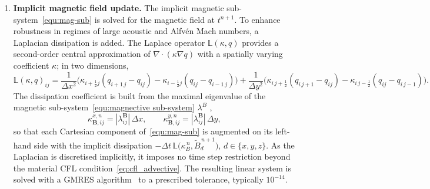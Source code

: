 \documentclass[a4paper,fleqn]{cas-sc}
\theoremstyle{definition}
\theoremstyle{remark}
\begin{document}
\begin{enumerate}
\item \textbf{Implicit magnetic field update.}
The implicit magnetic sub-system~\eqref{equ:mag-sub} is solved for the magnetic
field at $t^{n+1}$. To enhance robustness in regimes of large acoustic and
Alfvén Mach numbers, a Laplacian dissipation is added. The
Laplace operator $\mathbb{L}(\kappa,q)$ provides a second-order central
approximation of $\nabla\!\cdot(\kappa\nabla q)$ with a spatially varying
coefficient $\kappa$; in two dimensions,
\begin{equation}
\label{eq:laplacian}
\mathbb{L}(\kappa,q)_{ij}
= \frac{1}{\Delta x^{2}}\Big(
   \kappa_{i+\frac12 j}(q_{i+1\,j}-q_{ij})
 - \kappa_{i-\frac12 j}(q_{ij}-q_{i-1\,j})\Big)
+ \frac{1}{\Delta y^{2}}\Big(
   \kappa_{i\,j+\frac12}(q_{i\,j+1}-q_{ij})
 - \kappa_{i\,j-\frac12}(q_{ij}-q_{i\,j-1})\Big).
\end{equation}
The dissipation coefficient is built from the maximal eigenvalue of the magnetic
sub-system~\eqref{equ:magnective sub-system} $\lambda^{B}$ ,
\begin{equation}
\label{eq:kappa_B}
\kappa_{\mathbf{B},ij}^{x,n}=|\lambda^{\mathbf B}_{ij}|\,\Delta x,
\qquad
\kappa_{\mathbf{B},ij}^{y,n}=|\lambda^{\mathbf B}_{ij}|\,\Delta y,
\end{equation}
so that each Cartesian component of~\eqref{equ:mag-sub} is augmented on its
left-hand side with the implicit dissipation
$-\Delta t\,\mathbb{L}\bigl(\kappa_{B}^{\,n},\tilde B^{\,n+1}_{d}\bigr)$,
$d\in\{x,y,z\}$.
 As the Laplacian is discretised implicitly, it imposes no time step
restriction beyond the material CFL condition~\eqref{eq:cfl_advective}. The
resulting linear system is solved with a GMRES algorithm~\cite{GMRES} to a
prescribed tolerance, typically $10^{-14}$.


\end{enumerate}
\end{document}
